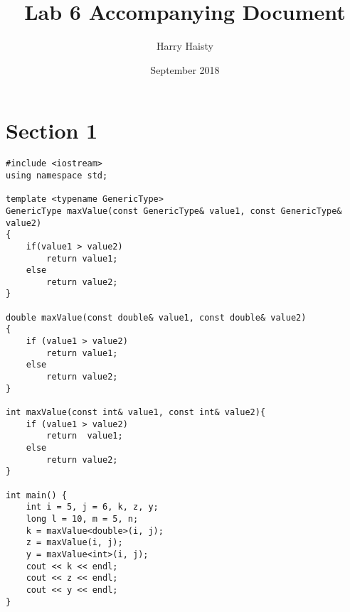 \documentclass[11pt]{article}
\title{Lab 6 Accompanying Document}
\author{Harry Haisty}
\date{September 2018}
\begin{document}
\maketitle

\section*{Section 1}
\begin{lstlisting}
#include <iostream>
using namespace std;

template <typename GenericType>
GenericType maxValue(const GenericType& value1, const GenericType& value2)
{
    if(value1 > value2)
        return value1;
    else
        return value2;
}

double maxValue(const double& value1, const double& value2)
{
    if (value1 > value2)
        return value1;
    else
        return value2;
}

int maxValue(const int& value1, const int& value2){
    if (value1 > value2)
        return  value1;
    else
        return value2;
}

int main() {
    int i = 5, j = 6, k, z, y;
    long l = 10, m = 5, n;
    k = maxValue<double>(i, j);
    z = maxValue(i, j);
    y = maxValue<int>(i, j);
    cout << k << endl;
    cout << z << endl;
    cout << y << endl;
}
\end{lstlisting}
\end{document}
